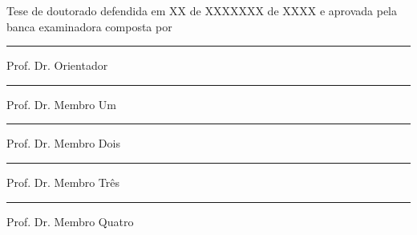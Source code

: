 \thispagestyle{plain}
\setcounter{page}{3}

\vspace*{2cm}
\begin{center}
    {\Large
    Tese de doutorado %
    defendida em
    XX %
    de
    XXXXXXX %
    de
    XXXX %
    e aprovada pela banca examinadora composta por
    }
\end{center}

\vspace{2cm}

\begin{center}
    \rule[1pt]{10cm}{.5pt}

    {\Large
    Prof. Dr. Orientador %
    }
\end{center}

\vspace{1.5cm}

\begin{center}
    \rule[1pt]{10cm}{.5pt}

    {\Large
    Prof. Dr. Membro Um %
    }
\end{center}

\vspace{1.5cm}

\begin{center}
    \rule[1pt]{10cm}{.5pt}

    {\Large
    Prof. Dr. Membro Dois %
    }
\end{center}

\vspace{1.5cm}

\begin{center}
    \rule[1pt]{10cm}{.5pt}

    {\Large
    Prof. Dr. Membro Tr\^es %
    }
\end{center}

\vspace{1.5cm}

\begin{center}
    \rule[1pt]{10cm}{.5pt}

    {\Large
    Prof. Dr. Membro Quatro %
    }
\end{center}
